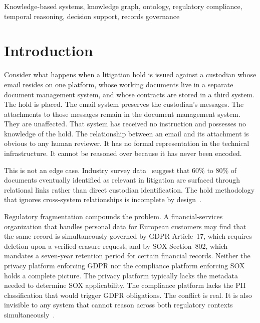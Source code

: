 \documentclass{ieeeaccess}
\begin{document}
\begin{keywords}
Knowledge-based systems, knowledge graph, ontology, regulatory compliance, temporal reasoning, decision support, records governance
\end{keywords}

\section{Introduction}

Consider what happens when a litigation hold is issued against a custodian whose email resides on one platform, whose working documents live in a separate document management system, and whose contracts are stored in a third system. The hold is placed. The email system preserves the custodian's messages. The attachments to those messages remain in the document management system. They are unaffected. That system has received no instruction and possesses no knowledge of the hold. The relationship between an email and its attachment is obvious to any human reviewer. It has no formal representation in the technical infrastructure. It cannot be reasoned over because it has never been encoded.

This is not an edge case. Industry survey data~\cite{sedona2019} suggest that 60\% to 80\% of documents eventually identified as relevant in litigation are surfaced through relational links rather than direct custodian identification. The hold methodology that ignores cross-system relationships is incomplete by design~\cite{zubulake}.

Regulatory fragmentation compounds the problem. A financial-services organization that handles personal data for European customers may find that the same record is simultaneously governed by GDPR Article~17, which requires deletion upon a verified erasure request, and by SOX Section~802, which mandates a seven-year retention period for certain financial records. Neither the privacy platform enforcing GDPR nor the compliance platform enforcing SOX holds a complete picture. The privacy platform typically lacks the metadata needed to determine SOX applicability. The compliance platform lacks the PII classification that would trigger GDPR obligations. The conflict is real. It is also invisible to any system that cannot reason across both regulatory contexts simultaneously~\cite{edrm,iso15489}.
\end{document}
